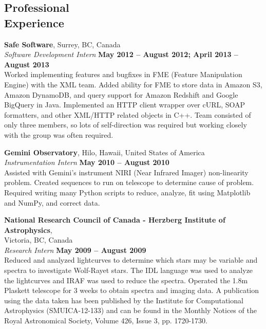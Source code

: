 \documentclass[margin,line]{resume}
\begin{document}
\begin{resume}
    \vspace{-5mm}
    \section{\mysidestyle Professional\\Experience}

    \textbf{Safe Software}, Surrey, BC, Canada \vspace{2mm}\\\vspace{1mm}%
    \textsl{Software Development Intern} \hfill \textbf{May  2012 -- August 2012; April 2013 -- August 2013}\\
    {\small
        Worked implementing features and bugfixes in FME (Feature Manipulation Engine) with the XML team.
    Added ability for FME to store data in Amazon S3, Amazon DynamoDB, and query support for Amazon Redshift and Google BigQuery in Java.
    Implemented an HTTP client wrapper over cURL, SOAP formatters, and other XML/HTTP related objects in C++.
    Team consisted of only three members, so lots of self-direction was required but working closely with the group was often required.}

    \textbf{Gemini Observatory}, Hilo, Hawaii, United States of America \vspace{2mm}\\\vspace{1mm}%
    \textsl{Instrumentation Intern} \hfill \textbf{May  2010 -- August 2010}\\
    {\small
    Assisted with Gemini's instrument NIRI (Near Infrared Imager) non-linearity problem.
    Created sequences to run on telescope to determine cause of problem.
    Required writing many Python scripts to reduce, analyze, fit using Matplotlib and NumPy, and correct data. }

    \newpage

    \textbf{National Research Council of Canada - Herzberg Institute of Astrophysics},\\ Victoria, BC, Canada \vspace{2mm}\\\vspace{1mm}%
    \textsl{Research Intern} \hfill \textbf{May  2009 -- August 2009}\\
    {\small
    Reduced and analyzed lightcurves to determine which stars may be variable and spectra to investigate Wolf-Rayet stars.
    The IDL language was used to analyze the lightcurves and IRAF was used to reduce the spectra.
    Operated the 1.8m Plaskett telescope for 3 weeks to obtain spectra and imaging data.
    A publication using the data taken has been published by the Institute for Computational Astrophysics (SMUICA-12-133) and can be found in the Monthly Notices of the Royal Astronomical Society, Volume 426, Issue 3, pp. 1720-1730.}
    


\end{resume}
\end{document}
